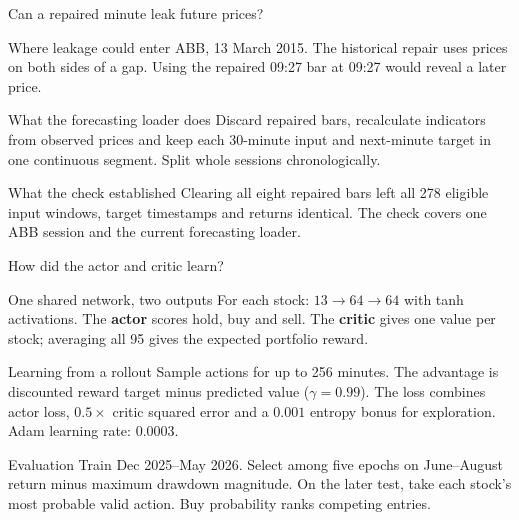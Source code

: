 \documentclass[aspectratio=169,10pt]{beamer}
\begin{document}
\begin{frame}{Can a repaired minute leak future prices?}
\begin{block}{Where leakage could enter}
ABB, 13 March 2015. The historical repair uses prices on both sides of a gap. Using the repaired 09:27 bar at 09:27 would reveal a later price.
\end{block}
\begin{block}{What the forecasting loader does}
Discard repaired bars, recalculate indicators from observed prices and keep each 30-minute input and next-minute target in one continuous segment. Split whole sessions chronologically.
\end{block}
\begin{block}{What the check established}
Clearing all eight repaired bars left all 278 eligible input windows, target timestamps and returns identical. The check covers one ABB session and the current forecasting loader.
\end{block}
\end{frame}
\begin{frame}{How did the actor and critic learn?}
\small
\begin{block}{One shared network, two outputs}
For each stock: $13\to64\to64$ with tanh activations. The \textbf{actor} scores hold, buy and sell. The \textbf{critic} gives one value per stock; averaging all 95 gives the expected portfolio reward.
\end{block}
\begin{block}{Learning from a rollout}
Sample actions for up to 256 minutes. The advantage is discounted reward target minus predicted value ($\gamma=0.99$). The loss combines actor loss, $0.5\times$ critic squared error and a $0.001$ entropy bonus for exploration. Adam learning rate: $0.0003$.
\end{block}
\begin{block}{Evaluation}
Train Dec 2025--May 2026. Select among five epochs on June--August return minus maximum drawdown magnitude. On the later test, take each stock's most probable valid action. Buy probability ranks competing entries.
\end{block}
\end{frame}
\end{document}
